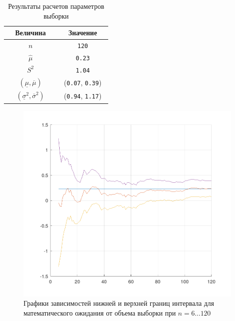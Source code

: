 \begin{table}
	\centering
	\begin{tabular}{|c|c|}
		\hline
		\textbf{~~Величина~~} & \textbf{~~Значение~~} \\
		\hline
		$n$ & \texttt{120} \\
		$\hat{\mu}$ & \texttt{0.23} \\
		$S^2$ & \texttt{1.04} \\
		$(\underline{\mu}, \overline{\mu})$ & (\texttt{0.07}, \texttt{0.39}) \\
		$(\underline{\sigma}^2, \overline{\sigma}^2)$ & (\texttt{0.94}, \texttt{1.17}) \\
		\hline
	\end{tabular}
	\caption{Результаты расчетов параметров выборки}
\end{table}

\begin{figure}
	\centering	\includegraphics[width=0.8\linewidth]{img/screenshot001}
	\caption{Графики зависимостей нижней и верхней границ интервала для математического ожидания от объема выборки при $n = 6\dots120$}
	\label{fig:screenshot001}
\end{figure}

